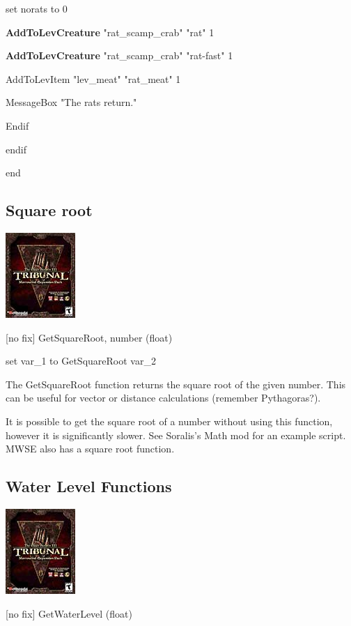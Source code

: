 \documentclass[
]{article}
\begin{document}
set norats to 0

\textbf{AddToLevCreature} "rat\_scamp\_crab" "rat" 1

\textbf{AddToLevCreature} "rat\_scamp\_crab" "rat-fast" 1

AddToLevItem "lev\_meat" "rat\_meat" 1

MessageBox "The rats return."

Endif

endif

end

\hypertarget{square-root}{%
\subsection{Square root}\label{square-root}}

\includegraphics{media/image6.png}

{[}no fix{]} GetSquareRoot, number (float)

set var\_1 to GetSquareRoot var\_2

The GetSquareRoot function returns the square root of the given number.
This can be useful for vector or distance calculations (remember
Pythagoras?).

It is possible to get the square root of a number without using this
function, however it is significantly slower. See Soralis's Math mod for
an example script. MWSE also has a square root function.

\hypertarget{water-level-functions}{%
\subsection{Water Level Functions}\label{water-level-functions}}

\includegraphics{media/image6.png}

{[}no fix{]} GetWaterLevel (float)
\end{document}
